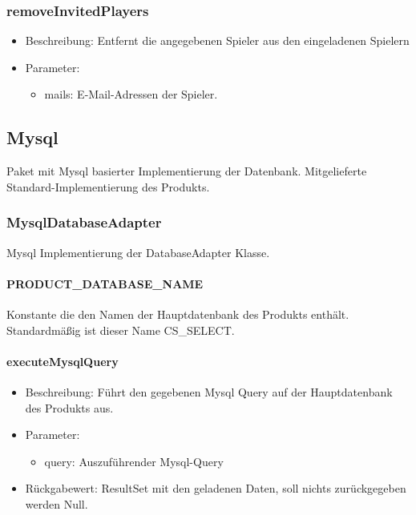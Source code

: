 \documentclass[a4paper]{scrreprt}
\begin{document}
    \subsubsection{removeInvitedPlayers}
    \begin{itemize}
        \item Beschreibung: Entfernt die angegebenen Spieler aus den eingeladenen Spielern
        \item Parameter:
        \begin{itemize}
            \item mails: E-Mail-Adressen der Spieler.
        \end{itemize}
    \end{itemize}

    \subsection{Mysql}
    Paket mit Mysql basierter Implementierung der Datenbank.
    Mitgelieferte Standard-Implementierung des Produkts.

    \subsubsection{MysqlDatabaseAdapter}
    Mysql Implementierung der DatabaseAdapter Klasse.

    \paragraph{PRODUCT\_DATABASE\_NAME}
    Konstante die den Namen der Hauptdatenbank des Produkts enthält.
    Standardmäßig ist dieser Name CS\_SELECT.

    \paragraph{executeMysqlQuery}
    \begin{itemize}
        \item Beschreibung: Führt den gegebenen Mysql Query auf der Hauptdatenbank des Produkts aus.
        \item Parameter:
        \begin{itemize}
            \item query: Auszuführender Mysql-Query
        \end{itemize}
        \item Rückgabewert: ResultSet mit den geladenen Daten, soll nichts zurückgegeben werden Null.
    \end{itemize}
\end{document}
